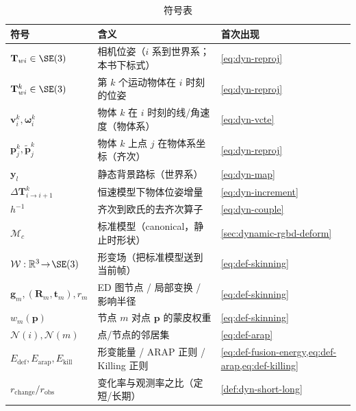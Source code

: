 \begin{table}[H]\centering\small
\caption{符号表}
\begin{tabular}{lll}
\toprule
符号 & 含义 & 首次出现 \\
\midrule
$\mathbf{T}_{wi}\in\SE(3)$ & 相机位姿（$i$ 系到世界系；本书下标式）& \cref{eq:dyn-reproj} \\
$\mathbf{T}_{wi}^{k}\in\SE(3)$ & 第 $k$ 个运动物体在 $i$ 时刻的位姿 & \cref{eq:dyn-reproj} \\
$\mathbf{v}_i^{k},\boldsymbol\omega_i^{k}$ & 物体 $k$ 在 $i$ 时刻的线/角速度（物体系）& \cref{eq:dyn-vcte} \\
$\mathbf{p}_j^{k},\tilde{\mathbf{p}}_j^{k}$ & 物体 $k$ 上点 $j$ 在物体系坐标（齐次）& \cref{eq:dyn-reproj} \\
$\mathbf{y}_l$ & 静态背景路标（世界系）& \cref{eq:dyn-map} \\
$\Delta\mathbf{T}^{k}_{i\to i+1}$ & 恒速模型下物体位姿增量 & \cref{eq:dyn-increment} \\
$h^{-1}$ & 齐次到欧氏的去齐次算子 & \cref{eq:dyn-couple} \\
$\mathcal{M}_c$ & 标准模型（canonical，静止时形状）& \cref{sec:dynamic-rgbd-deform} \\
$\mathcal{W}:\mathbb{R}^3\!\to\!\SE(3)$ & 形变场（把标准模型送到当前帧）& \cref{eq:def-skinning} \\
$\mathbf{g}_m,(\mathbf{R}_m,\mathbf{t}_m),r_m$ & ED 图节点 / 局部变换 / 影响半径 & \cref{eq:def-skinning} \\
$w_m(\mathbf{p})$ & 节点 $m$ 对点 $\mathbf{p}$ 的蒙皮权重 & \cref{eq:def-skinning} \\
$\mathcal{N}(i),\mathcal{N}(m)$ & 点/节点的邻居集 & \cref{eq:def-arap} \\
$E_{\mathrm{def}},E_{\mathrm{arap}},E_{\mathrm{kill}}$ & 形变能量 / ARAP 正则 / Killing 正则 & \cref{eq:def-fusion-energy,eq:def-arap,eq:def-killing} \\
$r_{\mathrm{change}}/r_{\mathrm{obs}}$ & 变化率与观测率之比（定短/长期）& \cref{def:dyn-short-long} \\
\bottomrule
\end{tabular}
\end{table}

